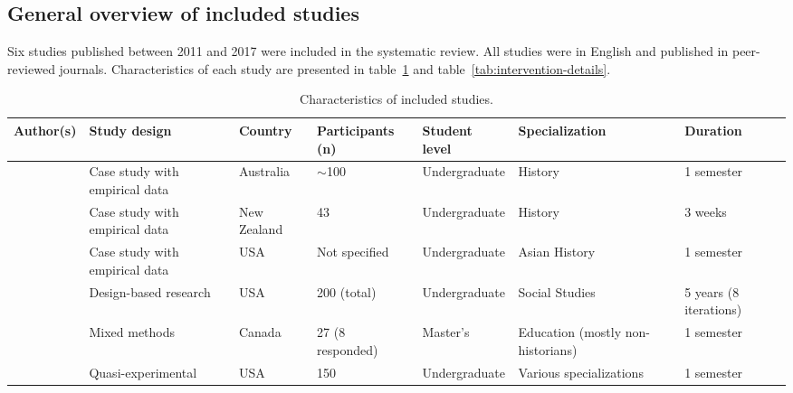 \documentclass[
hf,
]{ceurart}
\begin{document}

\subsection{General overview of included studies}

Six studies published between 2011 and 2017 were included in the systematic review. All studies were in English and published in peer-reviewed journals. Characteristics of each study are presented in table~\ref{tab:study-characteristics} and table~\ref{tab:intervention-details}.

\setlength \tabcolsep {0.2\tabcolsep }

\begin{table}[h]
\centering
\caption{Characteristics of included studies.}
\label{tab:study-characteristics}
\begin{tabular}{|p{2cm}|p{2.5cm}|l|p{2.3cm}|l|p{2.1cm}|p{1.5cm}|}
\hline
\textbf{Author(s)} & \textbf{Study design} & \textbf{Country} & \textbf{Participants (n)} & \textbf{Student level} & \textbf{Specialization} & \textbf{Duration} \\
\hline
\citet{Bell2016} & Case study with empirical data & Australia & $\sim$100 & Undergraduate & History & 1 semester \\
\hline
\citet{Coleborne2011}  & Case study with empirical data & New Zealand & 43 & Undergraduate & History & 3 weeks \\
\hline
\citet{Davis2017} & Case study with empirical data & USA & Not specified & Undergraduate & Asian History & 1 semester \\
\hline
\citet{Lee2014159}  & Design-based research & USA & 200 (total) & Undergraduate & Social Studies & 5 years (8 iterations) \\
\hline
\citet{McLean20144} & Mixed methods & Canada & 27 (8 responded) & Master's & Education (mostly non-historians) & 1 semester \\
\hline
\citet{Soh2013} & Quasi-experimental & USA & 150 & Undergraduate & Various specializations & 1 semester \\
\hline
\end{tabular}%
\end{table}
\end{document}
